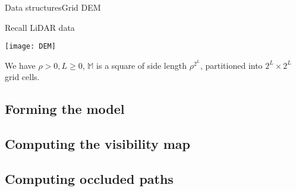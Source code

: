 \begin{frame}{Data structures}{Grid DEM}
	\only<1> {
		Recall LiDAR data

		\centering
		\texttt{[image: DEM]}
	}
	 {
		We have $\rho > 0, L \geq 0$, $\mathds{M}$ is a square of side length $\rho^{2^L}$, partitioned into $2^L \times 2^L$ grid cells.
	}
\end{frame}

\subsection{Forming the model}


\subsection{Computing the visibility map}


\subsection{Computing occluded paths}

